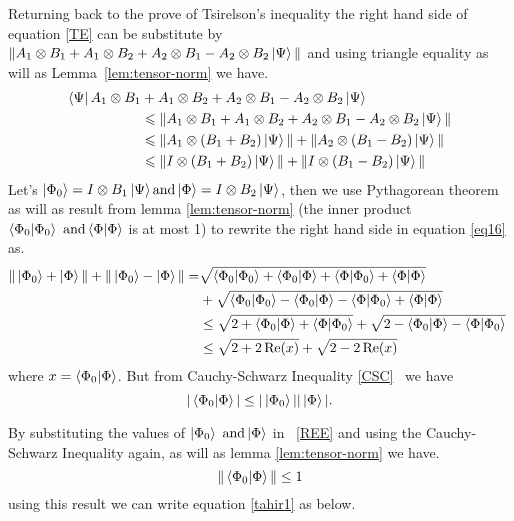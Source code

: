 Returning back to the prove of  Tsirelson’s inequality the right hand side of equation \ref{TE}  can be substitute by $\| A_1\otimes B_1+ A_1\otimes B_2+A_2\otimes B_1 -A_2\otimes B_2\ket{\Psi}\|$ and  using   triangle equality as will as Lemma~\ref{lem:tensor-norm} we have.
\begin{align}
\bra{\Psi}A_1\otimes B_1 &+ A_1\otimes B_2+A_2\otimes B_1 -A_2\otimes B_2\ket{\Psi} \\
&\leqslant  \| A_1\otimes B_1+ A_1\otimes B_2+A_2\otimes B_1 -A_2\otimes B_2\ket{\Psi}\| \nonumber\\
&\leqslant \| A_1\otimes (B_1+ B_2)\ket{\Psi}\| +\| A_2\otimes( B_1 - B_2)\ket{\Psi}\|\nonumber \\
&\leqslant \| I\otimes (B_1+ B_2)\ket{\Psi}\| +\| I\otimes( B_1 - B_2)\ket{\Psi}\|\label{eq16}
\end{align}
Let's $\ket{\Phi_0}=I\otimes B_1\ket{\Psi} \text{and}\ket{\Phi}=I\otimes B_2\ket{\Psi}$, then we  use  Pythagorean theorem as will as result from lemma \ref{lem:tensor-norm} (the inner product $\bra{\Phi_0}\ket{\Phi_0} \text{ and}\bra{\Phi}\ket{\Phi}$  is at most 1) to  rewrite the right hand side in equation \ref{eq16} as.
\begin{align}
\| \ket{\Phi_0}+ \ket{\Phi}\| +\| \ket{\Phi_0}- \ket{\Phi}\| = &\sqrt{\bra{\Phi_0}\ket{\Phi_0}+\bra{\Phi_0}\ket{\Phi}+\bra{\Phi}\ket{\Phi_0}+\bra{\Phi}\ket{\Phi}}\nonumber\\
&+\sqrt{\bra{\Phi_0}\ket{\Phi_0}-\bra{\Phi_0}\ket{\Phi}-\bra{\Phi}\ket{\Phi_0}+\bra{\Phi}\ket{\Phi}}\nonumber\\
 &\leq \sqrt{2+\bra{\Phi_0}\ket{\Phi}+\bra{\Phi}\ket{\Phi_0}}+\sqrt{2-\bra{\Phi_0}\ket{\Phi}-\bra{\Phi}\ket{\Phi_0}}\
\nonumber\\
&\leq \sqrt{2+2\Re(x)}+\sqrt{2-2\Re(x)}\label{tahir1}
\end{align} 
where $x= \bra{\Phi_0}\ket{\Phi}$. But from  Cauchy-Schwarz Inequality \ref{CSC}~ we have 
\begin{equation}\label{REE}
|\bra{\Phi_0}\ket{\Phi}|\leq |\ket{\Phi_0}||\ket{\Phi}|.
\end{equation}


By substituting the values of $\ket{\Phi_0} \text{ and} \ket{\Phi}$ in ~\ref{REE} and using the Cauchy-Schwarz Inequality again, as will as lemma \ref{lem:tensor-norm} we have.
\begin{equation}
\|\bra{\Phi_0}\ket{\Phi}\|\leq 1
\end{equation}
using this result we can write equation \ref{tahir1} as below.

